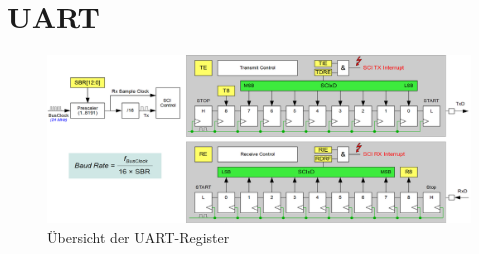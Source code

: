 \newpage
\section{UART}

\begin{figure}[h!]
	\centering
	\includegraphics[width=1\textwidth]{../fig/uart.pdf}
	\caption{Übersicht der UART-Register}
\end{figure}
